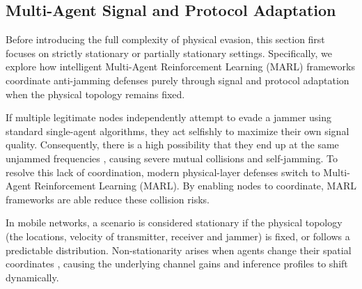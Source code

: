 \documentclass[conference]{IEEEtran}
\newcommand{\adm}[1]{{\color{orange}{[#1]}}}
\newcommand{\rar}[1]{{\color{blue}{[#1]}}}
\begin{document}
\subsection{Multi-Agent Signal and Protocol Adaptation}
Before introducing the full complexity of physical evasion, this section first focuses on strictly stationary or partially stationary settings.
Specifically, we explore how intelligent Multi-Agent Reinforcement Learning (MARL) frameworks coordinate anti-jamming defenses purely through signal and protocol adaptation when the physical topology remains fixed.

If multiple legitimate nodes independently attempt to evade a jammer using standard single-agent algorithms, they act selfishly to maximize their own signal quality.
Consequently, there is a high possibility that they end up at the same unjammed frequencies 
, causing severe mutual collisions and self-jamming.
To resolve this lack of coordination, modern physical-layer defenses switch to Multi-Agent Reinforcement Learning (MARL). 
By enabling nodes to coordinate, MARL frameworks are able reduce these collision risks.
 
In mobile networks, a scenario is considered stationary if the physical topology (the locations, velocity of transmitter, receiver and jammer) is fixed, or follows a predictable distribution.
Non-stationarity arises when agents change their spatial coordinates \adm{there are various other forms of non-stationarity beyond just position change. actually, mobile scenarios could also be seen stationary if the parameters that regulate movement (e.g., speed, model) do not change over time}
\rar{maybe decide on other form of non-stationarity? research}
, causing the underlying channel gains and inference profiles to shift dynamically.
\end{document}
